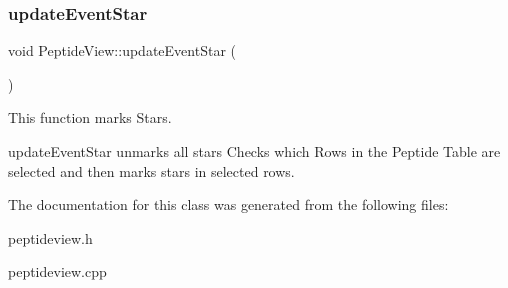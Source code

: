 \subsubsection{\texorpdfstring{update\+Event\+Star}{updateEventStar}}
{\footnotesize\ttfamily void Peptide\+View\+::update\+Event\+Star (\begin{DoxyParamCaption}{ }\end{DoxyParamCaption})\hspace{0.3cm}{\ttfamily [slot]}}



This function marks Stars. 

update\+Event\+Star unmarks all stars Checks which Rows in the Peptide Table are selected and then marks stars in selected rows. 

The documentation for this class was generated from the following files\+:\begin{DoxyCompactItemize}
\item 
peptideview.\+h\item 
peptideview.\+cpp\end{DoxyCompactItemize}
